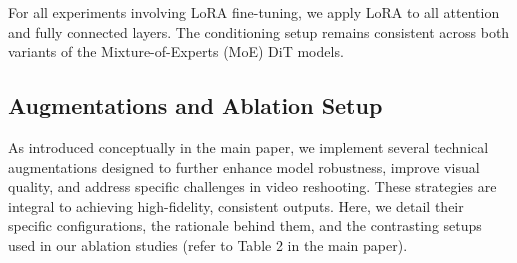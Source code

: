 For all experiments involving LoRA fine-tuning, we apply LoRA to all attention and fully connected layers. The conditioning setup remains consistent across both variants of the Mixture-of-Experts (MoE) DiT models.

\subsection{Augmentations and Ablation Setup}
\label{sec:augmentations_ablation_setup}

As introduced conceptually in the main paper, we implement several technical augmentations designed to further enhance model robustness, improve visual quality, and address specific challenges in video reshooting. These strategies are integral to achieving high-fidelity, consistent outputs. Here, we detail their specific configurations, the rationale behind them, and the contrasting setups used in our ablation studies (refer to Table 2 in the main paper).

